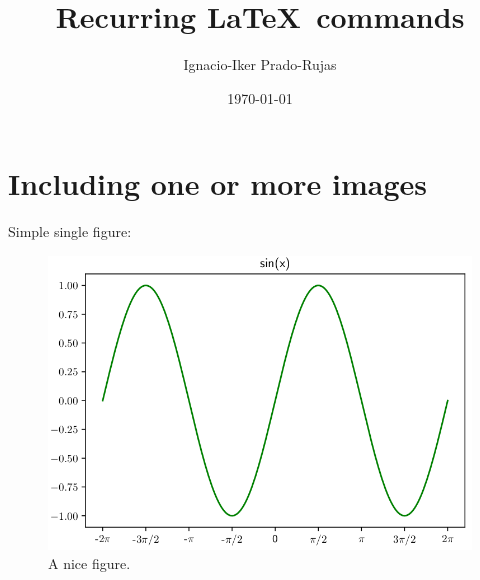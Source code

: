 \documentclass[11pt,a4paper,english,twoside,notitlepage,openright]{article}
\begin{document}
\title{Recurring \LaTeX\, commands}
\author{Ignacio-Iker Prado-Rujas}
\date{\today}

\maketitle


\tableofcontents
\newpage

\section{Including one or more images}

Simple single figure:
\begin{figure}[!h]
\centering
\includegraphics[scale=0.2]{figures/sin.png}
\caption{A nice figure.}
\label{fig:lab}
\end{figure}
\end{document}
